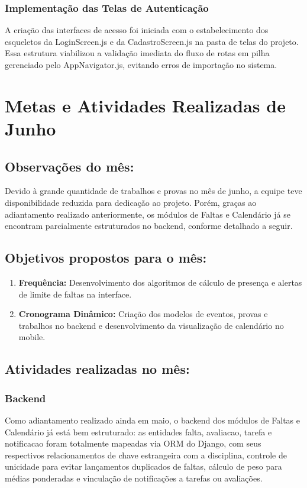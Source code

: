 \documentclass[12pt]{article}
\begin{document}
\subsubsection{Implementação das Telas de Autenticação}
A criação das interfaces de acesso foi iniciada com o estabelecimento dos esqueletos da LoginScreen.js e da CadastroScreen.js na pasta de telas do projeto. Essa estrutura viabilizou a validação imediata do fluxo de rotas em pilha gerenciado pelo AppNavigator.js, evitando erros de importação no sistema.


\section{Metas e Atividades Realizadas de Junho}

\subsection{Observações do mês:}
Devido à grande quantidade de trabalhos e provas no mês de junho, a equipe teve disponibilidade reduzida para dedicação ao projeto. Porém, graças ao adiantamento realizado anteriormente, os módulos de Faltas e Calendário já se encontram parcialmente estruturados no backend, conforme detalhado a seguir.

\subsection{Objetivos propostos para o mês:}
\begin{enumerate}
    \item \textbf{Frequência:} Desenvolvimento dos algoritmos de cálculo de presença e alertas de limite de faltas na interface.
    \item \textbf{Cronograma Dinâmico:} Criação dos modelos de eventos, provas e trabalhos no backend e desenvolvimento da visualização de calendário no mobile.
\end{enumerate}

\subsection{Atividades realizadas no mês:}

\subsubsection{Backend}
Como adiantamento realizado ainda em maio, o backend dos módulos de Faltas e Calendário já está bem estruturado: as entidades falta, avaliacao, tarefa e notificacao foram totalmente mapeadas via ORM do Django, com seus respectivos relacionamentos de chave estrangeira com a disciplina, controle de unicidade para evitar lançamentos duplicados de faltas, cálculo de peso para médias ponderadas e vinculação de notificações a tarefas ou avaliações.
\end{document}

